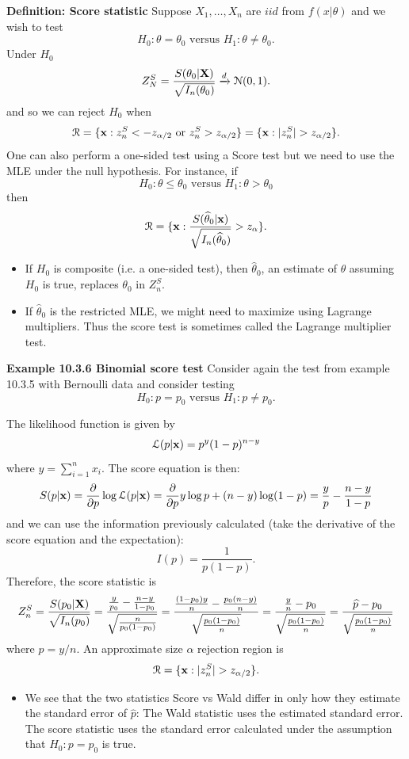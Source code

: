 \documentclass[11pt,]{article}
\newcommand{\Xndots}{X_1, \ldots, X_n}
\def\bx{{\bf x}}
\def\bX{{\bf X}}
\def\phat{{\widehat p}}
\def\thetahat{{\widehat\theta}}
\def\Lsc{{\cal L}}
\def\Nsc{{\cal N}}
\def\Rsc{{\cal R}}
\def\sumin{\sum_{i=1}^n}
\begin{document}
\noindent\textbf{Definition: Score statistic} Suppose \(\Xndots\) are
\(iid\) from \(f(x|\theta)\) and we wish to test
\[H_0: \theta = \theta_0 \mbox{ versus } H_1: \theta \neq \theta_0.\]
Under \(H_0\)
\[Z_N^S = \frac{S(\theta_0 |\bX)}{\sqrt{I_n(\theta_0)}} \xrightarrow{d} \Nsc(0,1).\]
and so we can reject \(H_0\) when
\[\Rsc = \{\bx : z_n^S < -z_{\alpha/2} \mbox{ or } z_n^S > z_{\alpha/2}\} =  \{\bx : |z_n^S| > z_{\alpha/2} \}.\]
One can also perform a one-sided test using a Score test but we need to
use the MLE under the null hypothesis. For instance, if
\[H_0: \theta \leq \theta_0 \mbox{ versus } H_1: \theta > \theta_0\]
then
\[\Rsc = \{\bx : \frac{S(\thetahat_0 |\bx)}{\sqrt{I_n(\thetahat_0)}} > z_{\alpha}\}.\]

\begin{itemize}
\item If $H_0$ is composite (i.e. a one-sided test), then $\thetahat_0$, an estimate of $\theta$ assuming $H_0$ is true, replaces $\theta_0$ in $Z_n^S$.
\item If $\thetahat_0$ is the restricted MLE, we might need to maximize using Lagrange multipliers. Thus the score test is sometimes called the Lagrange multiplier test.
\end{itemize}

\noindent\textbf{Example 10.3.6 Binomial score test} Consider again the
test from example 10.3.5 with Bernoulli data and consider testing
\[H_0: p = p_0 \mbox{ versus } H_1: p \neq p_0.\]

The likelihood function is given by \[\Lsc(p|\bx) = p^{y} (1-p)^{n-y}\]
where \(y = \sumin x_i\). The score equation is then: \[
S(p|\bx) = \frac{\partial}{\partial p}\log \Lsc(p|\bx)
= \frac{\partial}{\partial p} y \log p + (n-y) \log(1-p)
= \frac{y}{p} - \frac{n-y}{1-p}
\] and we can use the information previously calculated (take the
derivative of the score equation and the expectation):
\[I(p) = \frac{1}{p(1-p)}.\] Therefore, the score statistic is
\[Z_n^S = \frac{S(p_0|\bX)}{\sqrt{I_n(p_0)}} = 
\frac{\frac{y}{p_0} - \frac{n-y}{1-p_0}}{\sqrt{\frac{n}{p_0(1-p_0)}}}=
\frac{\frac{(1-p_0) y}{n} - \frac{p_0 (n-y)}{n}}{\sqrt{\frac{p_0(1-p_0)}{n}}} = \frac{\frac{y}{n} - p_0}{\sqrt{\frac{p_0(1-p_0)}{n}}} = \frac{\phat - p_0}{\sqrt{\frac{p_0(1-p_0)}{n}}}\]
where \(\phat = y/n\). An approximate size \(\alpha\) rejection region
is \[\Rsc = \{\bx : | z_n^S | > z_{\alpha/2}\}.\]

\begin{itemize}
\item We see that the two statistics Score vs Wald differ in only how they estimate the standard error of $\phat$:
The Wald statistic uses the estimated standard error. The score statistic uses the standard error calculated under the assumption that $H_0: p = p_0$ is true.
\end{itemize}
\end{document}
